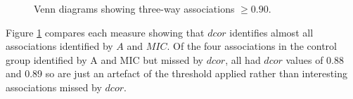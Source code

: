 \documentclass[a4paper, 12pt]{report}
\begin{document}
\begin{figure}
    \centering
    \qquad
    \caption{Venn diagrams showing three-way associations $\ge 0.90$.}
    \label{F:VennBig}
\end{figure}

Figure \ref{F:VennBig} compares each measure showing that $dcor$ identifies almost all associations identified by $A$ and $MIC$. Of the four associations in the control group identified by A and MIC but missed by $dcor$, all had $dcor$ values of 0.88 and 0.89 so are just an artefact of the threshold applied rather than interesting associations missed by $dcor$. %

\end{document}
